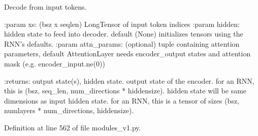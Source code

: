 \begin{DoxyVerb}Decode from input tokens.

:param xs:          (bsz x seqlen) LongTensor of input token indices
:param hidden:      hidden state to feed into decoder. default (None)
            initializes tensors using the RNN's defaults.
:param attn_params: (optional) tuple containing attention parameters,
            default AttentionLayer needs encoder_output states
            and attention mask (e.g. encoder_input.ne(0))

:returns:           output state(s), hidden state.
            output state of the encoder. for an RNN, this is
            (bsz, seq_len, num_directions * hiddensize).
            hidden state will be same dimensions as input
            hidden state. for an RNN, this is a tensor of sizes
            (bsz, numlayers * num_directions, hiddensize).
\end{DoxyVerb}
 

Definition at line 562 of file modules\+\_\+v1.\+py.


